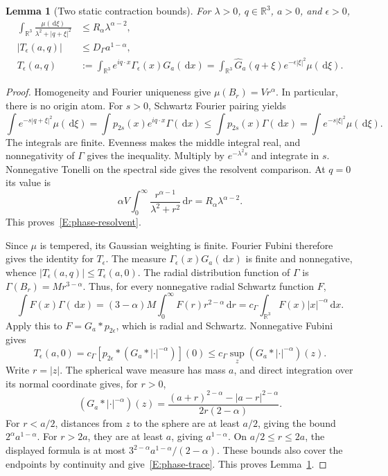 \documentclass[12pt]{article}
\numberwithin{equation}{section}
\newtheorem{lemma}[theorem]{Lemma}
\theoremstyle{definition}
\newcommand{\R}{\mathbb{R}}
\newcommand{\ud}{\,\mathrm{d}}
\begin{document}
\begin{lemma}[Two static contraction bounds]\label{L:phase-contractions}
  For $\lambda>0$, $q\in\R^3$, $a>0$, and $\epsilon>0$,
  \begin{align}
    \int_{\R^3}\frac{\mu(\ud\xi)}{\lambda^2+|q+\xi|^2}
    &\le R_\alpha\lambda^{\alpha-2},
    \label{E:phase-resolvent}\\
    \left|T_\epsilon(a,q)\right|
    &\le D_\Gamma a^{1-\alpha},
    \label{E:phase-trace}\\
    T_\epsilon(a,q)
    &:=\int_{\R^3}e^{iq\cdot x}\Gamma_\epsilon(x)G_a(\ud x)
    =\int_{\R^3}\widehat G_a(q+\xi)e^{-\epsilon|\xi|^2}
    \mu(\ud\xi).\nonumber
  \end{align}
\end{lemma}

\begin{proof}
  Homogeneity and Fourier uniqueness give
  $\mu(B_r)=Vr^\alpha$. In particular, there is no origin atom.
  For $s>0$, Schwartz Fourier pairing yields
  \[
    \int e^{-s|q+\xi|^2}\mu(\ud\xi)
    =\int p_{2s}(x)e^{iq\cdot x}\Gamma(\ud x)
    \le\int p_{2s}(x)\Gamma(\ud x)
    =\int e^{-s|\xi|^2}\mu(\ud\xi).
  \]
  The integrals are finite. Evenness makes the middle integral real,
  and nonnegativity of $\Gamma$ gives the inequality. Multiply by
  $e^{-\lambda^2s}$ and integrate in $s$. Nonnegative Tonelli on
  the spectral side gives the resolvent comparison. At $q=0$ its
  value is
  \[
    \alpha V\int_0^\infty\frac{r^{\alpha-1}}{\lambda^2+r^2}\ud r
    =R_\alpha\lambda^{\alpha-2}.
  \]
  This proves~\eqref{E:phase-resolvent}.

  Since $\mu$ is tempered, its Gaussian weighting is finite. Fourier
  Fubini therefore gives the identity for $T_\epsilon$. The measure
  $\Gamma_\epsilon(x)G_a(\ud x)$ is finite and nonnegative, whence
  $|T_\epsilon(a,q)|\le T_\epsilon(a,0)$.
  The radial distribution function of $\Gamma$ is
  $\Gamma(B_r)=Mr^{3-\alpha}$. Thus, for every nonnegative radial
  Schwartz function $F$,
  \[
    \int F(x)\Gamma(\ud x)
    =(3-\alpha)M\int_0^\infty F(r)r^{2-\alpha}\ud r
    =c_\Gamma\int_{\R^3}F(x)|x|^{-\alpha}\ud x.
  \]
  Apply this to $F=G_a*p_{2\epsilon}$, which is radial and Schwartz.
  Nonnegative Fubini gives
  \[
    T_\epsilon(a,0)
    =c_\Gamma[p_{2\epsilon}*(G_a*|\cdot|^{-\alpha})](0)
    \le c_\Gamma\sup_z(G_a*|\cdot|^{-\alpha})(z).
  \]
  Write $r=|z|$. The spherical wave measure has mass $a$, and direct
  integration over its normal coordinate gives, for $r>0$,
  \[
    (G_a*|\cdot|^{-\alpha})(z)
    =\frac{(a+r)^{2-\alpha}-|a-r|^{2-\alpha}}
    {2r(2-\alpha)}.
  \]
  For $r<a/2$, distances from $z$ to the sphere are at least $a/2$,
  giving the bound $2^\alpha a^{1-\alpha}$. For $r>2a$, they are
  at least $a$, giving $a^{1-\alpha}$. On $a/2\le r\le2a$, the
  displayed formula is at most
  $3^{2-\alpha}a^{1-\alpha}/(2-\alpha)$. These bounds also cover
  the endpoints by continuity and give~\eqref{E:phase-trace}.
  This proves Lemma~\ref{L:phase-contractions}.
\end{proof}
\end{document}
